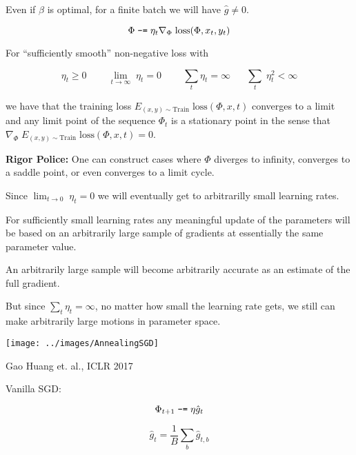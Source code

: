 {\vfill
Even if $\beta$ is optimal, for a finite batch we will have $\hat{g} \not = 0$.


$$\Phi \;\mbox{\tt -=} \; \eta_t \nabla_\Phi\;\mathrm{loss}(\Phi,x_t,y_t)$$

\vfill
For ``sufficiently smooth'' non-negative loss with

\vfill
$$\eta_t \geq 0\;\;\;\;\;\;\;\;\lim_{t \rightarrow \infty} \;\eta_t = 0\;\;\;\;\;\;\;\;\sum_t \eta_t = \infty \;\;\;\;\;\;\sum_t \;\eta_t^2 < \infty$$

\vfill
we have that the training loss $E_{(x,y) \sim \mathrm{Train}}\; \mathrm{loss}(\Phi,x,t)$ converges to a limit and any limit point of the sequence $\Phi_t$
is a stationary point in the sense that {\huge  $\nabla_\Phi \; E_{(x,y) \sim \mathrm{Train}} \;\mathrm{loss}(\Phi,x,t) = 0$}.

\vfill
{\Large
\vfill
{\bf Rigor Police:} One can construct cases where $\Phi$ diverges to infinity, converges to a saddle point, or even converges to a limit cycle.

}


Since $\lim_{t \rightarrow 0} \;\eta_t = 0$ we will eventually get to arbitrarilly small learning rates.

\vfill
For sufficiently small learning rates any meaningful update of the parameters will be based on an arbitrarily large sample
of gradients at essentially the same parameter value.

\vfill
An arbitrarily large sample will become arbitrarily accurate as an estimate of the full gradient.

\vfill
But since $\sum_t \eta_t = \infty$, no matter how small the learning rate gets, we still can make arbitrarily large motions in parameter space.


\centerline{\texttt{[image: ../images/AnnealingSGD]}}
\centerline{\Large Gao Huang et. al., ICLR 2017}


Vanilla SGD:


$$\Phi_{t+1} \;\mbox{\tt -=}\; \eta \hat{g}_t$$

\vfill
$$\hat{g}_t = \frac{1}{B} \sum_b \hat{g}_{t,b}$$

}
